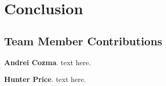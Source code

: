 
\section{Conclusion}




\appendix
\subsection{Team Member Contributions}

\textbf{Andrei Cozma}. text here.


\textbf{Hunter Price}. text here.




